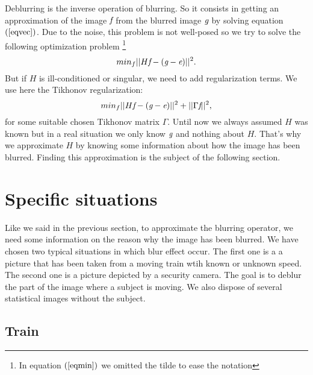 Deblurring is the inverse operation of blurring. So it consists in getting an approximation of the image $\emph{f}$ from the blurred image $\emph{g}$ by solving equation $(\ref{eqvec})$. Due to the noise, this problem is not well-posed so we try to solve the following optimization problem \footnote{In equation $(\ref{eqmin})$ we omitted the tilde to ease the notation}
\begin{equation}
min_f ||H\emph{f}-(\emph{g}-\emph{e})||^2.
\label{eqmin}
\end{equation}
But if $H$ is ill-conditioned or singular, we need to add regularization terms. We use here the Tikhonov regularization:
\begin{equation}
min_f ||H\emph{f}-(\emph{g}-\emph{e})||^2+||\Gamma \emph{f}||^2,
\end{equation}
for some suitable chosen Tikhonov matrix $\Gamma$. Until now we always assumed $H$ was known but in a real situation we only know $\emph{g}$ and nothing about $H$. That's why we approximate $H$ by knowing some information about how the image has been blurred. Finding this approximation is the subject of the following section.

\section{Specific situations}

Like we said in the previous section, to approximate the blurring operator, we need some information on the reason why the image has been blurred. We have chosen two typical situations in which blur effect occur. The first one is a a picture that has been taken from a moving train wtih known or unknown speed. The second one is a picture depicted by a security camera. The goal is to deblur the part of the image where a subject is moving. We also dispose of several statistical images without the subject.

\subsection{Train}

